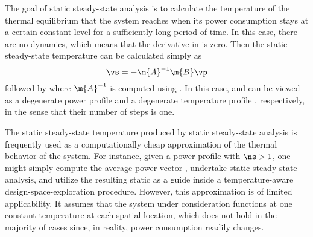 The goal of static steady-state analysis is to calculate the temperature of the
thermal equilibrium that the system reaches when its power consumption stays at
a certain constant level \vp for a sufficiently long period of time. In this
case, there are no dynamics, which means that the derivative in
 is zero. Then the static steady-state
temperature \vq can be calculated simply as
\[
  \vs = -\m{A}^{-1} \m{B} \vp
\]
followed by  where $\m{A}^{-1}$ is computed using
. In this case, \vp and \vq can be viewed as a degenerate
power profile \mp and a degenerate temperature profile \mq, respectively, in the
sense that their number of steps \ns is one.

The static steady-state temperature produced by static steady-state analysis is
frequently used as a computationally cheap approximation of the thermal behavior
of the system. For instance, given a power profile \mp with $\ns > 1$, one might
simply compute the average power vector \vp, undertake static steady-state
analysis, and utilize the resulting static \vq as a guide inside a
temperature-aware design-space-exploration procedure. However, this
approximation is of limited applicability. It assumes that the system under
consideration functions at one constant temperature at each spatial location,
which does not hold in the majority of cases since, in reality, power
consumption readily changes.
